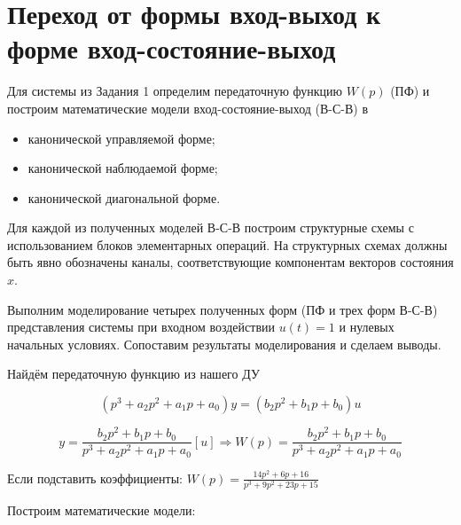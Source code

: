 \section{Переход от формы вход-выход к форме вход-состояние-выход}

Для системы из Задания 1 определим передаточную функцию $W(p)$ (ПФ) и построим математические модели вход-состояние-выход (В-С-В) в
\begin{itemize}
    \item канонической управляемой форме;
    \item канонической наблюдаемой форме;
    \item канонической диагональной форме.
\end{itemize}

Для каждой из полученных моделей В-С-В построим структурные схемы с использованием блоков элементарных операций. На структурных схемах должны быть явно обозначены каналы, соответствующие компонентам векторов состояния $x$.

Выполним моделирование четырех полученных форм (ПФ и трех форм В-С-В) представления системы при входном воздействии $u(t) = 1$ и нулевых начальных условиях. Сопоставим результаты моделирования и сделаем выводы.


\begin{par}
\begin{flushleft}
Найдём передаточную функцию из нашего ДУ
\end{flushleft}
\end{par}

$$(p^3 +a_2 p^2 +a_1 p+a_0 )y=(b_2 p^2 +b_1 p+b_0 )u$$


\begin{par}
$$y=\frac{b_2 p^2 +b_1 p+b_0 }{p^3 +a_2 p^2 +a_1 p+a_0 }[u]\Rightarrow W(p)=\frac{b_2 p^2 +b_1 p+b_0 }{p^3 +a_2 p^2 +a_1 p+a_0 }$$
\end{par}

\begin{par}
\begin{flushleft}
Если подставить коэффициенты: $W(p)=\frac{14p^2 +6p+16}{p^3 +9p^2 +23p+15}$
\end{flushleft}
\end{par}

\begin{par}
\begin{flushleft}
Построим математические модели:
\end{flushleft}
\end{par}


